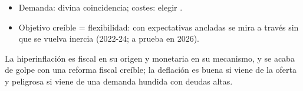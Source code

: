 \documentclass{article}
\begin{document}
\begin{columnas}
\begin{itemize}
\item Demanda: divina coincidencia; costes: elegir .
\item Objetivo creíble = flexibilidad: con expectativas ancladas se mira a través sin que se vuelva inercia (2022-24; a prueba en 2026).
\end{itemize}

\begin{ideaclave}
La hiperinflación es fiscal en su origen y monetaria en su mecanismo, y se acaba de golpe con una reforma fiscal creíble; la deflación es buena si viene de la oferta y peligrosa si viene de una demanda hundida con deudas altas.
\end{ideaclave}


\end{columnas}
\end{document}
